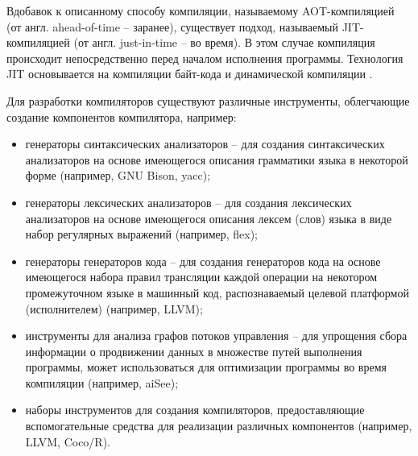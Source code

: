 Вдобавок к описанному способу компиляции, называемому AOT-компиляцией (от англ. ahead-of-time -- заранее), существует подход, называемый JIT-компиляцией (от англ. just-in-time -- во время).
В этом случае компиляция происходит непосредственно перед началом исполнения программы.
Технология JIT основывается на компиляции байт-кода и динамической компиляции \cite{prof_thain}.

Для разработки компиляторов существуют различные инструменты, облегчающие создание компонентов компилятора, например:

\begin{itemize}
    \item генераторы синтаксических анализаторов -- для создания синтаксических анализаторов на основе имеющегося описания грамматики языка в некоторой форме (например, GNU Bison, yacc);
    \item генераторы лексических анализаторов -- для создания лексических анализаторов на основе имеющегося описания лексем (слов) языка в виде набор регулярных выражений (например, flex);
    \item генераторы генераторов кода -- для создания генераторов кода на основе имеющегося набора правил трансляции каждой операции на некотором промежуточном языке в машинный код, распознаваемый целевой платформой (исполнителем) (например, LLVM);
    \item инструменты для анализа графов потоков управления -- для упрощения сбора информации о продвижении данных в множестве путей выполнения программы, может использоваться для оптимизации программы во время компиляции (например, aiSee);
    \item наборы инструментов для создания компиляторов, предоставляющие вспомогательные средства для реализации различных компонентов (например, LLVM, Coco/R).
\end{itemize}
